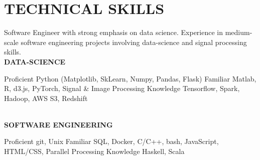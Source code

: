 \documentclass[]{cv-style}
\begin{document}
\section{TECHNICAL SKILLS}
\vspace{-0.25cm}
%
Software Engineer with strong emphasis on data science. Experience in 
medium-scale software engineering projects involving data-science and signal  
processing skills. \\[0.15cm] 
\textbf{DATA-SCIENCE} \\[0.15cm]
\begin{entrylist}
%
\entry
{Proficient}
{{\normalfont Python (Matplotlib, SkLearn, Numpy, Pandas, Flask)}}
{}{\vspace{-0.5cm}}
%
\entry
{Familiar}
{{\normalfont Matlab, R, d3.js, PyTorch, Signal \& Image Processing}}
{}{\vspace{-0.5cm}}
%
\entry
{Knowledge}
{{\normalfont Tensorflow, Spark, Hadoop, AWS S3, Redshift}}{}{}
%
\end{entrylist}
\vspace{-0.55cm}\\
\textbf{SOFTWARE ENGINEERING} \\[0.15cm]
\begin{entrylist}
%
\entry
{Proficient}
{{\normalfont git, Unix}}
{}{\vspace{-0.5cm}}
%
\entry
{Familiar}
{{\normalfont SQL, Docker, C/C++, bash, JavaScript, HTML/CSS, Parallel 
Processing}}
{}{\vspace{-0.5cm}}
%
\entry
{Knowledge}
{{\normalfont Haskell, Scala}}
{}{\vspace{-0.5cm}}
%
\end{entrylist}
\end{document}
